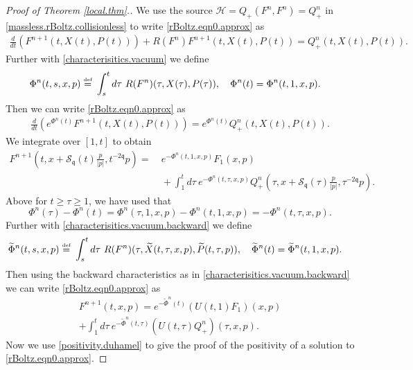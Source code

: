 \documentclass[reqno]{amsart}
\newcommand{\eqdef }{\overset{\mbox{\tiny{def}}}{=}}
\newcommand{\pv}{p}
\newcommand{\qq}{\mathfrak{q}}
\newcommand{\tiq}{\mathcal{S}_{\qq}}
\newcommand{\sourceS}{\mathcal{H}}
\theoremstyle{definition}
\numberwithin{equation}{section}
\numberwithin{theorem}{section}
\begin{document}
\begin{proof}[Proof of Theorem \ref{local.thm}.]
We use the source ${\sourceS} = Q_+(F^{n},F^{n})=Q_+^{n}$ in \eqref{massless.rBoltz.collisionless} to write \eqref{rBoltz.eqn0.approx} as  
\begin{align*}
    \frac{d}{dt } \left(F^{n+1}(t,{X}(t),{P}(t)) \right)
    + R(F^{n})F^{n+1}(t,{X}(t),{P}(t))
    = {Q_+^{n}}(t,{X}(t),{P}(t)).
\end{align*}
Further with \eqref{characterisitics.vacuum} we define
\begin{align*}
       \Phi^{n}(t,s, x,\pv) \eqdef &~ \int_s^t d\tau~
    R(F^{n})(\tau,{X}(\tau),{P}(\tau)), \quad \Phi^{n}(t) = \Phi^{n}(t,1, x,\pv).
\end{align*}
Then we can write \eqref{rBoltz.eqn0.approx} as 
\begin{align*}
    \frac{d}{dt } \left(e^{\Phi^{n}(t)}F^{n+1}(t,{X}(t),{P}(t)) \right)
    = e^{\Phi^{n}(t)}{Q_+^{n}}(t,{X}(t),{P}(t)).
\end{align*}We integrate over $[1,t]$ to obtain
\begin{align*}
    F^{n+1}\left(t,x+\tiq(t)\frac{\pv}{ |\pv|},{t^{-2\qq }} \pv \right) 
    = &~ 
   e^{-\Phi^{n}(t,1, x,\pv)}  F_1(x,p)
    \\
    &~ 
    + \int_1^t d\tau~ e^{-\Phi^{n}(t,\tau, x,\pv)} {Q_+^{n}}
    \left(\tau,x+\tiq(\tau)\frac{\pv}{ |\pv|},{\tau^{-2\qq }} \pv \right). 
\end{align*}
Above for $t\geq \tau \geq 1$, we have used that
\begin{equation*}
    \Phi^{n}(\tau)-\Phi^{n}(t) 
    =
     \Phi^{n}(\tau,1, x,\pv)-\Phi^{n}(t,1, x,\pv)
     =
     -\Phi^{n}(t,\tau, x,\pv).
\end{equation*}
Further with \eqref{characterisitics.vacuum.backward} we define 
\begin{align*}
       \widetilde{\Phi}^{n}(t,s, x,\pv) \eqdef &~ \int_s^t d\tau~
    R(F^{n})(\tau,\widetilde{X}(t,\tau,x,\pv),\widetilde{P}(t,\tau,\pv)),
       \quad \widetilde{\Phi}^{n}(t) = \widetilde{\Phi}^{n}(t,1, x,\pv). 
\end{align*}
Then using the backward characteristics as in \eqref{characterisitics.vacuum.backward}  we can write \eqref{rBoltz.eqn0.approx} as 
\begin{multline}\label{positivity.duhamel}
            F^{n+1}(t,x,\pv) 
    =  
   e^{-\widetilde{\Phi}^{n}(t)} (U(t,1)F_1)(x,\pv) 
   \\
    + 
    \int_1^t d\tau~ e^{-\widetilde{\Phi}^{n}(t,\tau)}
    (U(t,\tau){Q_+^{n}})(\tau,x,\pv).
\end{multline}
Now we use \eqref{positivity.duhamel} to give the proof of the positivity of a solution to \eqref{rBoltz.eqn0.approx}.




\end{proof}
\end{document}

